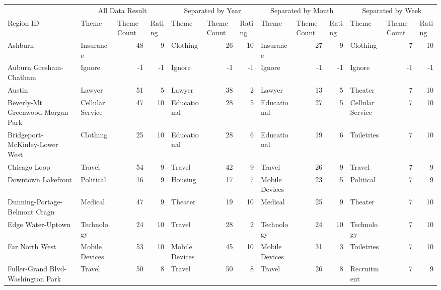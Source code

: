 \begin{tabular}[htbp]
  \centering
    \begin{tabular}{llrrlrrlrrlrr}
          & \multicolumn{3}{c}{All Data Result} & \multicolumn{3}{c}{Separated by Year} & \multicolumn{3}{c}{Separated by Month} & \multicolumn{3}{c}{Separated by Week} \\
    Region ID & Theme & \multicolumn{1}{l}{Theme Count} & \multicolumn{1}{l}{Rating} & Theme & \multicolumn{1}{l}{Theme Count} & \multicolumn{1}{l}{Rating} & Theme & \multicolumn{1}{l}{Theme Count} & \multicolumn{1}{l}{Rating} & Theme & \multicolumn{1}{l}{Theme Count} & \multicolumn{1}{l}{Rating} \\
    Ashburn & Insurance & 48    & 9     & Clothing & 26    & 10    & Insurance & 27    & 9     & Clothing & 7     & 10 \\
    Auburn Gresham-Chatham & Ignore & -1    & -1    & Ignore & -1    & -1    & Ignore & -1    & -1    & Ignore & -1    & -1 \\
    Austin & Lawyer & 51    & 5     & Lawyer & 38    & 2     & Lawyer & 13    & 5     & Theater & 7     & 10 \\
    Beverly-Mt Greenwood-Morgan Park & Cellular Service & 47    & 10    & Educational & 28    & 5     & Educational & 27    & 5     & Cellular Service & 7     & 10 \\
    Bridgeport-McKinley-Lower West & Clothing & 25    & 10    & Educational & 28    & 6     & Educational & 19    & 6     & Toiletries & 7     & 10 \\
    Chicago Loop & Travel & 54    & 9     & Travel & 42    & 9     & Travel & 26    & 9     & Travel & 7     & 9 \\
    Downtown Lakefront & Political & 16    & 9     & Housing & 17    & 7     & Mobile Devices & 23    & 5     & Political & 7     & 9 \\
    Dunning-Portage-Belmont Cragn & Medical & 47    & 9     & Theater & 19    & 10    & Medical & 25    & 9     & Theater & 7     & 10 \\
    Edge Water-Uptown & Technology & 24    & 10    & Travel & 28    & 2     & Technology & 24    & 10    & Technology & 7     & 10 \\
    Far North West & Mobile Devices & 53    & 10    & Mobile Devices & 45    & 10    & Mobile Devices & 31    & 3     & Toiletries & 7     & 10 \\
    Fuller-Grand Blvd-Washington Park & Travel & 50    & 8     & Travel & 50    & 8     & Travel & 26    & 8     & Recruitment & 7     & 9 \\

\end{tabular}
\end{tabular}
